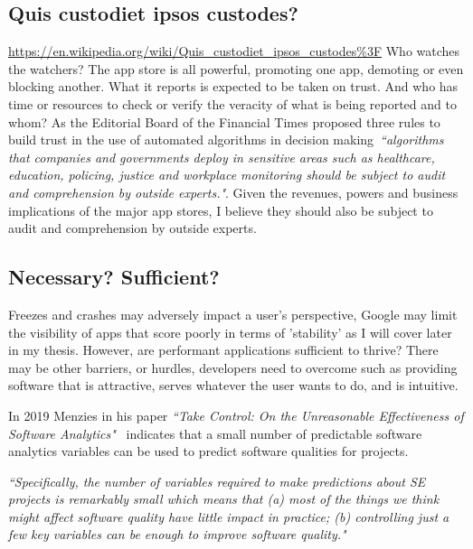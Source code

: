\subsection{Quis custodiet ipsos custodes?}
\url{https://en.wikipedia.org/wiki/Quis_custodiet_ipsos_custodes\%3F}
Who watches the watchers? The app store is all powerful, promoting one app, demoting or even blocking another. What it reports is expected to be taken on trust. And who has time or resources to check or verify the veracity of what is being reported and to whom? As the Editorial Board of the Financial Times proposed three rules to build trust in the use of automated algorithms in decision making~\emph{``algorithms that companies and governments deploy in sensitive areas such as healthcare, education, policing, justice and workplace monitoring should be subject to audit and comprehension by outside experts."}\citep{ft2021_building_trust_in_ai_systems_is_essential}. Given the revenues, powers and business implications of the major app stores, I believe they should also be subject to audit and comprehension by outside experts.


\subsection{Necessary? Sufficient?}
Freezes and crashes may adversely impact a user's perspective, Google may limit the visibility of apps that score poorly in terms of 'stability' as I will cover later in my thesis. However, are performant applications sufficient to thrive? There may be other barriers, or hurdles, developers need to overcome such as providing software that is attractive, serves whatever the user wants to do, and is intuitive.

In 2019 Menzies in his paper \emph{``Take Control: On the Unreasonable Effectiveness of Software Analytics"}~\cite{menzies2019take} indicates that a small number of predictable software analytics variables can be used to predict software qualities for projects. 

\emph{``Specifically, the number of variables required to make predictions about SE projects is remarkably small which means that (a) most of the things we think might affect software quality have little impact in practice; (b) controlling just a few key variables can be enough to improve software quality."}

